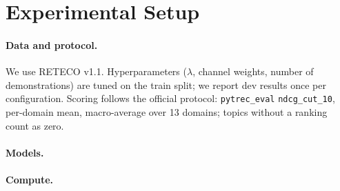 \section{Experimental Setup}
\label{sec:setup}

\paragraph{Data and protocol.} We use RETECO v1.1. Hyperparameters ($\lambda$, channel weights,
number of demonstrations) are tuned on the train split; we report dev results once per
configuration. Scoring follows the official protocol: \texttt{pytrec\_eval} \texttt{ndcg\_cut\_10},
per-domain mean, macro-average over 13 domains; topics without a ranking count as zero.

\paragraph{Models.} 

\paragraph{Compute.} 
